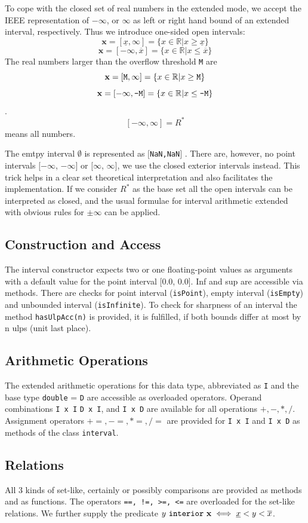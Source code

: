 \documentclass{report}
\newcommand{\R}{\mathbb{R}}
\newcommand{\xx}{\mathbf{x}}
\begin{document}
To cope with the closed set of real numbers in the extended mode, we accept the
IEEE representation 
of $-\infty$, or  $\infty$  as left or right hand
bound of an extended interval, respectively. Thus we introduce one-sided open
intervals: 
\[ \xx = [\underline{x},\infty] = \{ x \in \R | x \ge\underline{x}\} \]
\[ \xx = [-\infty,\overline{x}] = \{ x \in \R | x \le\overline{x}\} \]
The real numbers larger than the overflow threshold \verb|M| are
\[ \xx = [ \verb|M|,\infty] = \{ x \in \R | x \ge \verb|M|\} \]
\[ \xx = [-\infty,\verb|-M|] = \{ x \in \R | x \le\verb|-M|\} \].
\[
 [-\infty,\infty] = R^*\] means all numbers.

The emtpy interval
$\emptyset$  is represented as $[$\verb|NaN,NaN|$]$ .
There are, however, no point
intervals  $[-\infty$,   $-\infty]$ or $[\infty$,   $\infty]$, we use the
closed exterior intervals
instead. This trick helps in a clear set theoretical interpretation and also
facilitates the implementation. If we consider $R^*$ as the base set all the
open intervals can be interpreted as closed, and the usual formulae for
interval arithmetic extended with obvious rules for $\pm \infty$ can be
applied. 

\subsection{Construction and Access}
The interval constructor expects two or one floating-point values
as arguments with a default
value for the point interval [0.0, 0.0]. Inf and sup are accessible via
methods. There are checks for point interval (\verb|isPoint|), empty interval
(\verb|isEmpty|) and unbounded interval  (\verb|isInfinite|). To check for
sharpness of an interval the method  \verb|hasUlpAcc(n)| is provided, it is
fulfilled, if both bounds differ at most by n ulps (unit last place).
 
\subsection{Arithmetic Operations}
The extended arithmetic operations for this data type, abbreviated as \verb|I|
and the base type \verb|double| = \verb|D| are accessible as overloaded
operators. Operand combinations \verb|I x I| \verb|D x I|, and \verb|I x D| are
available for all operations $+, -, *, /$.
Assignment
operators $+=,-=,*=,/=$ are provided for  \verb|I x I| and \verb|I x D| as
methods of the class \texttt{interval}.


\subsection{Relations}
All 3 kinds of set-like, certainly or possibly comparisons \cite{sun} are
provided as methods and as functions.
 The operators \verb|==, !=, >=, <=| are overloaded for
the set-like relations. We further supply the predicate  $y\ \verb|interior|
\ \xx \iff \underline{x}<y<\overline{x}$. 
\end{document}

